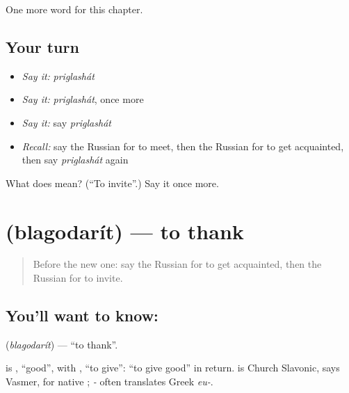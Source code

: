 \begin{grammarlens}[title={What you've built}]
One more word for this chapter.
\end{grammarlens}

\subsection*{Your turn}
\begin{itemize}
\raggedright
  \item \emph{Say it:} \emph{priglashát}
  \item \emph{Say it:} \emph{priglashát}, once more
  \item \emph{Say it:} say \emph{priglashát}
  \item \emph{Recall:} say the Russian for to meet, then the Russian for to get acquainted, then say \emph{priglashát} again
\end{itemize}

\begin{tcolorbox}[breakable,colback=teal!4,colframe=teal!35!black,title={Before you move on}]
What does  mean? (\textquotedblleft{}To invite\textquotedblright{}.) Say it once more.
\end{tcolorbox}
\section[\texorpdfstring{\ru{благодарить} (blagodarít)}{благодарить (blagodarít)}]{ (blagodarít) — to thank}

\label{lesson:RU-C141-blagodarit}



\begin{quote}
Before the new one: say the Russian for to get acquainted, then the Russian for to invite.
\end{quote}

\subsection*{You'll want to know: }
\textbf{} (\emph{blagodarít}) — \textquotedblleft{}to thank\textquotedblright{}.

\begin{cousinweb}
\textbf{} is \emph{}, \textquotedblleft{}good\textquotedblright{}, with \emph{}, \textquotedblleft{}to give\textquotedblright{}: \textquotedblleft{}to give good\textquotedblright{} in return. \emph{} is Church Slavonic, says Vasmer, for native \emph{}; \emph{-} often translates Greek \emph{eu-}.
\end{cousinweb}


